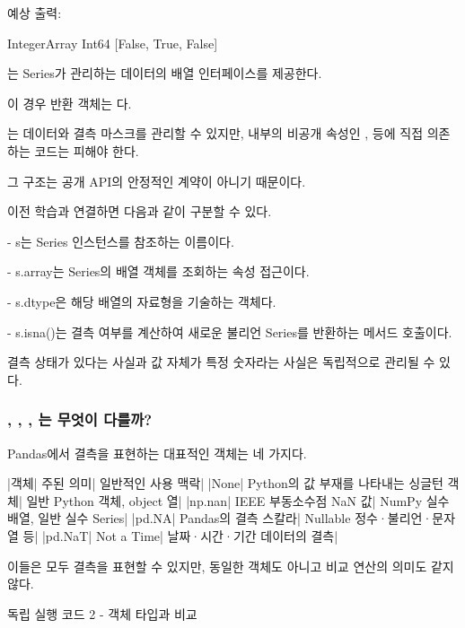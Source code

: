 예상 출력:

\begin{dhkzsh}
IntegerArray
Int64
[False, True, False]
\end{dhkzsh}

는 Series가 관리하는 데이터의 배열 인터페이스를 제공한다.

이 경우 반환 객체는 다.

는 데이터와 결측 마스크를 관리할 수 있지만, 내부의 비공개 속성인 ,  등에 직접 의존하는 코드는 피해야 한다.

그 구조는 공개 API의 안정적인 계약이 아니기 때문이다.

이전 학습과 연결하면 다음과 같이 구분할 수 있다.

\begin{dhksmry}
    - s는 Series 인스턴스를 참조하는 이름이다.

    - s.array는 Series의 배열 객체를 조회하는 속성 접근이다.

    - s.dtype은 해당 배열의 자료형을 기술하는 객체다.

    - s.isna()는 결측 여부를 계산하여 새로운 불리언 Series를
      반환하는 메서드 호출이다.
\end{dhksmry}

결측 상태가 있다는 사실과 값 자체가 특정 숫자라는 사실은 독립적으로 관리될 수 있다.

\subsubsection{, , , 는 무엇이 다를까?}

Pandas에서 결측을 표현하는 대표적인 객체는 네 가지다.

\begin{dhktable}
|객체|	주된 의미|	일반적인 사용 맥락|
|None|	Python의 값 부재를 나타내는 싱글턴 객체|	일반 Python 객체, object 열|
|np.nan|	IEEE 부동소수점 NaN 값|	NumPy 실수 배열, 일반 실수 Series|
|pd.NA|	Pandas의 결측 스칼라|	Nullable 정수·불리언·문자열 등|
|pd.NaT|	Not a Time|	날짜·시간·기간 데이터의 결측|
\end{dhktable}

이들은 모두 결측을 표현할 수 있지만, 동일한 객체도 아니고 비교 연산의 의미도 같지 않다.

\begin{dhknote}
\begin{dhksmry}[centered]
독립 실행 코드 2 - 객체 타입과 비교
\end{dhksmry}
\end{dhknote}

